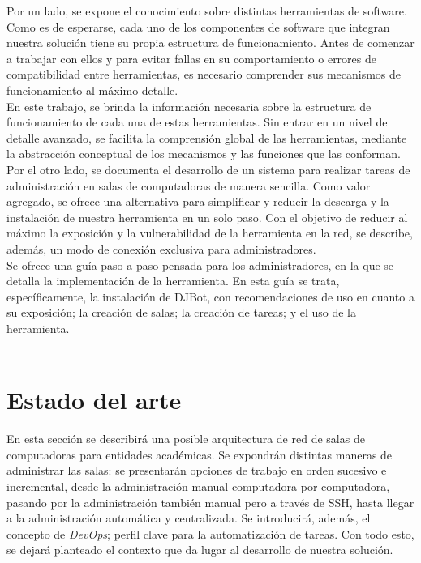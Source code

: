 \documentclass[a4paper,12pt]{article}
\begin{document}
Por un lado, se expone el conocimiento sobre distintas herramientas de software. Como es de esperarse, cada uno de los componentes de software que integran nuestra solución tiene su propia estructura de funcionamiento. Antes de comenzar a trabajar con ellos y para evitar fallas en su comportamiento o errores de compatibilidad entre herramientas, es necesario comprender sus mecanismos de funcionamiento al máximo detalle.\\

En este trabajo, se brinda la información necesaria sobre la estructura de funcionamiento de cada una de estas herramientas. Sin entrar en un nivel de detalle avanzado, se facilita la comprensión global de las herramientas, mediante la abstracción conceptual de los mecanismos y las funciones que las conforman.\\

Por el otro lado, se documenta el desarrollo de un sistema para realizar tareas de administración en salas de computadoras de manera sencilla. Como valor agregado, se ofrece una alternativa para simplificar y reducir la descarga y la instalación de nuestra herramienta en un solo paso. Con el objetivo de reducir al máximo la exposición y la vulnerabilidad de la herramienta en la red, se describe, además, un modo de conexión exclusiva para administradores.\\

Se ofrece una guía paso a paso pensada para los administradores, en la que se detalla la implementación de la herramienta. En esta guía se trata, específicamente, la instalación de DJBot, con recomendaciones de uso en cuanto a su exposición; la creación de salas; la creación de tareas; y el uso de la herramienta.\\

\newpage\\
\section{Estado del arte}
\label{sec:orgheadline13}

En esta sección se describirá una posible arquitectura de red de salas de computadoras para entidades académicas. Se expondrán distintas maneras de administrar las salas: se presentarán opciones de trabajo en orden sucesivo e incremental, desde la administración manual computadora por computadora, pasando por la administración también manual pero a través de SSH, hasta llegar a la administración automática y centralizada. Se introducirá, además, el concepto de \emph{DevOps}; perfil clave para la automatización de tareas. Con todo esto, se dejará planteado el contexto que da lugar al desarrollo de nuestra solución.\\
\end{document}
